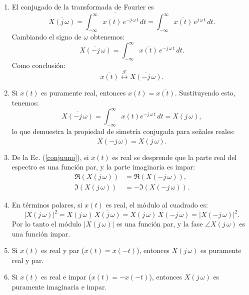 \documentclass[11pt,a4paper,openany]{book}
\begin{document}
\begin{enumerate}
	\item El conjugado de la transformada de Fourier es 
	\begin{equation}
		\overline{X(j \, \omega)} = \overline{\int_{-\infty}^{\infty} x(t) \, e^{-j \, \omega \, t} \, dt} = \int_{-\infty}^{\infty} \overline{x(t)} \, e^{j \, \omega \, t} \, dt.
	\end{equation}
	Cambiando el signo de $\omega$ obtenemos:
	\begin{equation}
		\overline{X(-j \, \omega)} = \int_{-\infty}^{\infty} \overline{x(t)} \, e^{-j \, \omega \, t} \, dt.
	\end{equation}
	Como conclusión:
	\begin{equation}
		\overline{x(t)} \stackrel{\mathcal{F}}{\longleftrightarrow} \overline{X(-j \, \omega)} .
	\end{equation}
	
	\item Si $x(t)$ es puramente real, entonces $x(t) = \overline{x(t)}$. Sustituyendo esto, tenemos:
	\begin{equation}
		\overline{X(-j \, \omega)} = \int_{-\infty}^{\infty} x(t) e^{-j \, \omega \, t} \, dt = X(j \, \omega),
	\end{equation}
	lo que demuestra la propiedad de simetría conjugada para señales reales:
	\begin{equation}
		X(-j \, \omega) = \overline{X(j \, \omega)} . \label{conjuuno}
	\end{equation}
	
	\item De la Ec. (\ref{conjuuno}), si $x(t)$ es real se desprende que la parte real del espectro es una función par, y la parte imaginaria es impar:
	\begin{align}
		\Re(X(j \, \omega)) &= \Re(X(-j \, \omega)), \\
		\Im(X(j \, \omega)) &= -\Im(X(-j \, \omega)).
	\end{align}
	
	\item En términos polares, si $x(t)$ es real, el módulo al cuadrado es:
	\begin{equation}
		|X(j \, \omega)|^{2} = X(j \, \omega) \, \overline{X(j \, \omega)} = X(j \, \omega) \, X(-j \, \omega) = |X(-j \, \omega)|^{2}.
	\end{equation}
	Por lo tanto el módulo $|X(j \, \omega)|$ es una función par, y la fase $\angle X(j \, \omega)$ es una función impar.
	
	\item Si $x(t)$ es real y par ($x(t) = x(-t)$), entonces $X(j \, \omega)$ es puramente real y par.
	\item Si $x(t)$ es real e impar ($x(t) = -x(-t)$), entonces $X(j \, \omega)$ es puramente imaginaria e impar.
\end{enumerate}
\end{document}
